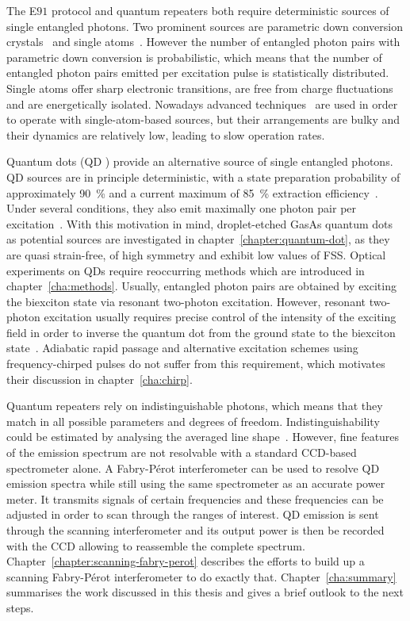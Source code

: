 The E$91$ protocol and quantum repeaters both require deterministic sources of single entangled photons.
Two prominent sources are parametric down conversion crystals~\cite{shih_new_1988} and single atoms~\cite{norden_entangled_2018}\cite{aspect_experimental_1981}.
However the number of entangled photon pairs with parametric down conversion is probabilistic, which means that the number of entangled photon pairs emitted per excitation pulse is statistically distributed.
Single atoms offer sharp electronic transitions, are free from charge fluctuations and are energetically isolated.
Nowadays advanced techniques~\cite{kuhn_deterministic_2002} are used in order to operate with single-atom-based sources, but their arrangements are bulky and their dynamics are relatively low, leading to slow operation rates.

Quantum dots (\ac{QD} ) provide an alternative source of single entangled photons.
\ac{QD} sources are in principle deterministic, with a state preparation probability of approximately \SI{90}{\percent} and a current maximum of \SI{85}{\percent} extraction efficiency~\cite{liu_solid-state_2019}.
Under several conditions, they also emit maximally one photon pair per excitation~\cite{schweickert_-demand_2018}.
With this motivation in mind, droplet-etched GasAs quantum dots as potential sources are investigated in chapter~\ref{chapter:quantum-dot}, as they are quasi strain-free, of high symmetry and exhibit low values of \ac{FSS}.
Optical experiments on \acp{QD} require reoccurring methods which are introduced in chapter~\ref{cha:methods}. 
Usually, entangled photon pairs are obtained by exciting the biexciton state via resonant two-photon excitation.
However, resonant two-photon excitation usually requires precise control of the intensity of the exciting field in order to inverse the quantum dot from the ground state to the biexciton state~\cite{jayakumar_deterministic_2013}.
Adiabatic rapid passage and alternative excitation schemes using frequency-chirped pulses do not suffer from this requirement, which motivates their discussion in chapter~\ref{cha:chirp}.

Quantum repeaters rely on indistinguishable photons, which means that they match in all possible parameters and degrees of freedom.
Indistinguishability could be estimated by analysing the averaged line shape~\cite{reindl_all-photonic_2018}. However, fine features of the emission spectrum are not resolvable with a standard CCD-based spectrometer alone.
A Fabry-Pérot interferometer can be used to resolve \ac{QD} emission spectra while still using the same spectrometer as an accurate power meter.
It transmits signals of certain frequencies and these frequencies can be adjusted in order to scan through the ranges of interest.
\ac{QD} emission is sent through the scanning interferometer and its output power is then be recorded with the CCD allowing to reassemble the complete spectrum.
Chapter~\ref{chapter:scanning-fabry-perot} describes the efforts to build up a scanning Fabry-Pérot interferometer to do exactly that.
Chapter~\ref{cha:summary} summarises the work discussed in this thesis and gives a brief outlook to the next steps.

